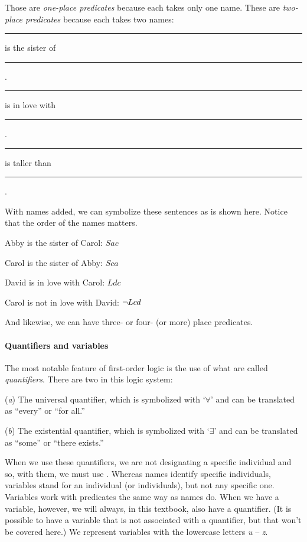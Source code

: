 Those are \textit{one-place predicates} because each takes only one name. These are \textit{two-place predicates} because each takes two names:

\begin{ebullet}
	\item[] \rule{1cm}{0.15mm} is the sister of \rule{1cm}{0.15mm} .
	\item[] \rule{1cm}{0.15mm} is in love with \rule{1cm}{0.15mm} .
	\item[] \rule{1cm}{0.15mm} is taller than \rule{1cm}{0.15mm} .
\end{ebullet}
With names added, we can symbolize these sentences as is shown here. Notice that the order of the names matters.

\begin{ebullet}
	\item[] Abby is the sister of Carol: $Sac$
	\item[] Carol is the sister of Abby: $Sca$
	\item[] David is in love with Carol: $Ldc$
	\item[] Carol is not in love with David: ${\neg} Lcd$
\end{ebullet}
And likewise, we can have three- or four- (or more) place predicates. 


\paragraph{Quantifiers and variables}

The most notable feature of first-order logic is the use of what are called \textit{quantifiers}. There are two in this logic system:

\begin{ebullet}
	\item[(\textit{a})] The universal quantifier, which is symbolized with `$\forall$' and can be translated as ``every'' or ``for all.''
	\item[(\textit{b})] The existential quantifier, which is symbolized with `$\exists$' and can be translated as ``some'' or ``there exists.''
\end{ebullet}

When we use these quantifiers, we are not designating a specific individual and so, with them, we must use . Whereas names identify specific individuals, variables stand for an individual (or individuals), but not any specific one. Variables work with predicates the same way as names do. When we have a variable, however, we will always, in this textbook, also have a quantifier. (It is possible to have a variable that is not associated with a quantifier, but that won't be covered here.) We represent variables with the lowercase letters \textit{u} -- \textit{z}.

